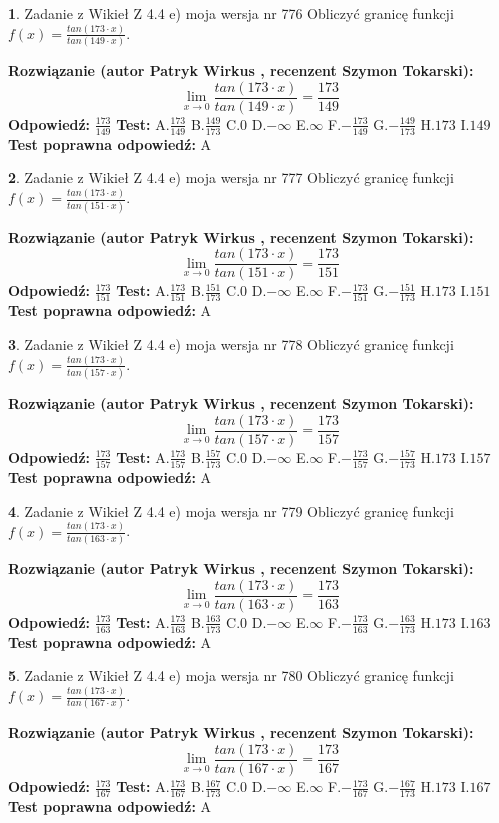 \documentclass[12pt, a4paper]{article}
\theoremstyle{definition} %
\newtheorem{zad}{}
\newcommand{\zadStart}[1]{\begin{zad}#1\newline}
\newcommand{\zadStop}{\end{zad}}
\newcommand{\rozwStart}[2]{\noindent \textbf{Rozwiązanie (autor #1 , recenzent #2): }\newline}
\newcommand{\rozwStop}{\newline}
\newcommand{\odpStart}{\noindent \textbf{Odpowiedź:}\newline}
\newcommand{\odpStop}{\newline}
\newcommand{\testStart}{\noindent \textbf{Test:}\newline}
\newcommand{\testStop}{\newline}
\newcommand{\kluczStart}{\noindent \textbf{Test poprawna odpowiedź:}\newline}
\newcommand{\kluczStop}{\newline}
\begin{document}
\zadStart{Zadanie z Wikieł Z 4.4 e) moja wersja nr 776}
Obliczyć granicę funkcji $f(x)=\frac{tan(173\cdot x)}{tan(149\cdot x)}$.
\zadStop
\rozwStart{Patryk Wirkus}{Szymon Tokarski}
$$\lim\limits_{x\to 0}\frac{tan(173\cdot x)}{tan(149\cdot x)}=
\frac{173}{149}$$
\rozwStop
\odpStart
$\frac{173}{149}$
\odpStop
\testStart
A.$\frac{173}{149}$
B.$\frac{149}{173}$
C.$0$
D.$-\infty$
E.$\infty$
F.$-\frac{173}{149}$
G.$-\frac{149}{173}$
H.$173$
I.$149$
\testStop
\kluczStart
A
\kluczStop



\zadStart{Zadanie z Wikieł Z 4.4 e) moja wersja nr 777}
Obliczyć granicę funkcji $f(x)=\frac{tan(173\cdot x)}{tan(151\cdot x)}$.
\zadStop
\rozwStart{Patryk Wirkus}{Szymon Tokarski}
$$\lim\limits_{x\to 0}\frac{tan(173\cdot x)}{tan(151\cdot x)}=
\frac{173}{151}$$
\rozwStop
\odpStart
$\frac{173}{151}$
\odpStop
\testStart
A.$\frac{173}{151}$
B.$\frac{151}{173}$
C.$0$
D.$-\infty$
E.$\infty$
F.$-\frac{173}{151}$
G.$-\frac{151}{173}$
H.$173$
I.$151$
\testStop
\kluczStart
A
\kluczStop



\zadStart{Zadanie z Wikieł Z 4.4 e) moja wersja nr 778}
Obliczyć granicę funkcji $f(x)=\frac{tan(173\cdot x)}{tan(157\cdot x)}$.
\zadStop
\rozwStart{Patryk Wirkus}{Szymon Tokarski}
$$\lim\limits_{x\to 0}\frac{tan(173\cdot x)}{tan(157\cdot x)}=
\frac{173}{157}$$
\rozwStop
\odpStart
$\frac{173}{157}$
\odpStop
\testStart
A.$\frac{173}{157}$
B.$\frac{157}{173}$
C.$0$
D.$-\infty$
E.$\infty$
F.$-\frac{173}{157}$
G.$-\frac{157}{173}$
H.$173$
I.$157$
\testStop
\kluczStart
A
\kluczStop



\zadStart{Zadanie z Wikieł Z 4.4 e) moja wersja nr 779}
Obliczyć granicę funkcji $f(x)=\frac{tan(173\cdot x)}{tan(163\cdot x)}$.
\zadStop
\rozwStart{Patryk Wirkus}{Szymon Tokarski}
$$\lim\limits_{x\to 0}\frac{tan(173\cdot x)}{tan(163\cdot x)}=
\frac{173}{163}$$
\rozwStop
\odpStart
$\frac{173}{163}$
\odpStop
\testStart
A.$\frac{173}{163}$
B.$\frac{163}{173}$
C.$0$
D.$-\infty$
E.$\infty$
F.$-\frac{173}{163}$
G.$-\frac{163}{173}$
H.$173$
I.$163$
\testStop
\kluczStart
A
\kluczStop



\zadStart{Zadanie z Wikieł Z 4.4 e) moja wersja nr 780}
Obliczyć granicę funkcji $f(x)=\frac{tan(173\cdot x)}{tan(167\cdot x)}$.
\zadStop
\rozwStart{Patryk Wirkus}{Szymon Tokarski}
$$\lim\limits_{x\to 0}\frac{tan(173\cdot x)}{tan(167\cdot x)}=
\frac{173}{167}$$
\rozwStop
\odpStart
$\frac{173}{167}$
\odpStop
\testStart
A.$\frac{173}{167}$
B.$\frac{167}{173}$
C.$0$
D.$-\infty$
E.$\infty$
F.$-\frac{173}{167}$
G.$-\frac{167}{173}$
H.$173$
I.$167$
\testStop
\kluczStart
A
\kluczStop
\end{document}
